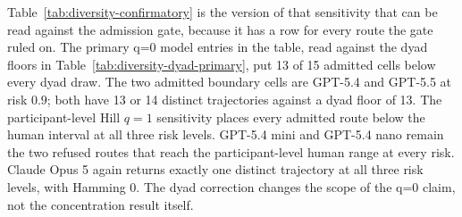 \documentclass{article}
\begin{document}
Table~\ref{tab:diversity-confirmatory} is the version of that sensitivity that
can be read against the admission gate, because it has a row for every route
the gate ruled on. The primary q{=}0 model entries in the table, read against
the dyad floors in Table~\ref{tab:diversity-dyad-primary}, put 13 of 15 admitted
cells below every dyad draw. The two admitted boundary cells are GPT-5.4 and
GPT-5.5 at risk $0.9$; both have 13 or 14 distinct trajectories against a dyad
floor of 13. The participant-level Hill $q{=}1$ sensitivity places every
admitted route below the human interval at all three risk levels. GPT-5.4 mini
and GPT-5.4 nano remain the two refused routes that reach the participant-level
human range at every risk. Claude Opus 5 again returns exactly one distinct
trajectory at all three risk levels, with Hamming 0. The dyad correction changes
the scope of the q{=}0 claim, not the concentration result itself.
\end{document}

